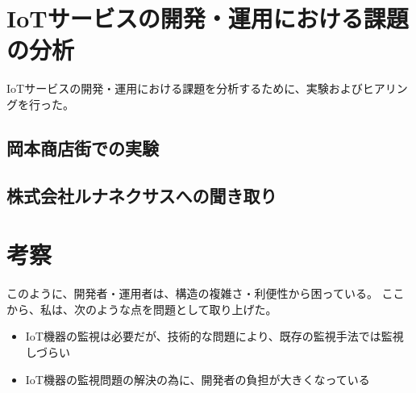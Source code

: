 \section{IoTサービスの開発・運用における課題の分析}
IoTサービスの開発・運用における課題を分析するために、実験およびヒアリングを行った。
\subsection{岡本商店街での実験}


\subsection{株式会社ルナネクサスへの聞き取り}



\section{考察}

このように、開発者・運用者は、構造の複雑さ・利便性から困っている。
ここから、私は、次のような点を問題として取り上げた。
\begin{itemize}
\item IoT機器の監視は必要だが、技術的な問題により、既存の監視手法では監視しづらい
\item IoT機器の監視問題の解決の為に、開発者の負担が大きくなっている
\end{itemize}


